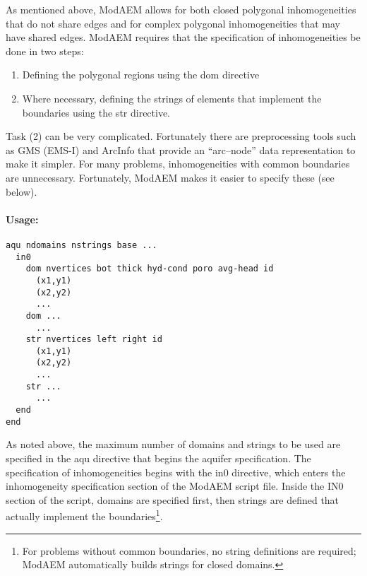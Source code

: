 As mentioned above, ModAEM allows for both closed polygonal inhomogeneities that do not share edges and for complex polygonal inhomogeneities that may have shared edges. ModAEM requires that the specification of inhomogeneities be done in two steps:
\begin{enumerate}
\item Defining the polygonal regions using the \textsf{dom} directive
\item Where necessary, defining the strings of elements that implement the boundaries using the \textsf{str} directive.
\end{enumerate}
Task (2) can be very complicated. Fortunately there are preprocessing tools such as GMS (EMS-I) and ArcInfo that provide an ``arc--node'' data representation to make it simpler. For many problems, inhomogeneities with common boundaries are unnecessary. Fortunately, ModAEM makes it easier to specify these (see below).

\paragraph{Usage:}
\begin{verbatim}
aqu ndomains nstrings base ...
  in0
    dom nvertices bot thick hyd-cond poro avg-head id
      (x1,y1)
      (x2,y2)
      ...
    dom ...
      ...
    str nvertices left right id
      (x1,y1)
      (x2,y2)
      ...
    str ...
      ...
  end
end
\end{verbatim}
As noted above, the maximum number of domains and strings to be used are specified in the \textsf{aqu} directive that begins the aquifer specification. The specification of inhomogeneities begins with the \textsf{in0} directive, which enters the inhomogeneity specification section of the ModAEM script file. Inside the IN0 section of the script, domains are specified first, then strings are defined that actually implement the boundaries\footnote{For problems without common boundaries, no string definitions are required; ModAEM automatically builds strings for closed domains.}.


